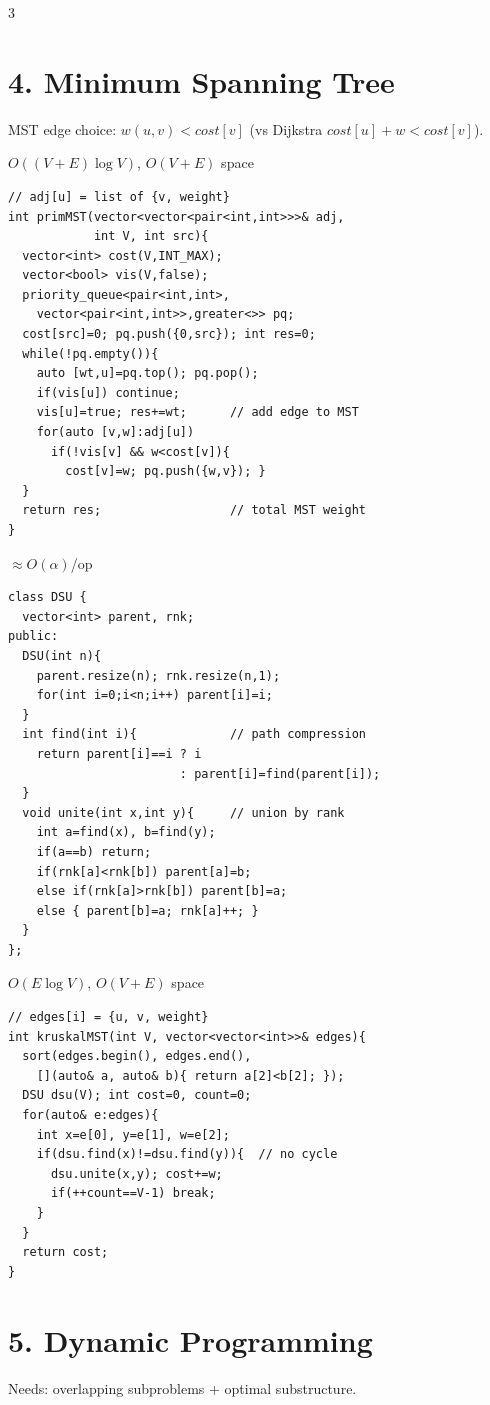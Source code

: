 \documentclass[8pt,landscape,a4paper]{extarticle}
\newcommand{\algo}[2]{\vspace{1pt}{\bfseries #1}\hfill{\footnotesize\color{cx}#2}\par\vspace{-1pt}}
\begin{document}
\begin{multicols}{3}
\section*{4. Minimum Spanning Tree}
{\footnotesize MST edge choice: $w(u,v)<cost[v]$ (vs Dijkstra $cost[u]{+}w<cost[v]$).}

\algo{Prim's Algorithm}{$O((V{+}E)\log V)$, $O(V{+}E)$ space}
\begin{lstlisting}
// adj[u] = list of {v, weight}
int primMST(vector<vector<pair<int,int>>>& adj,
            int V, int src){
  vector<int> cost(V,INT_MAX);
  vector<bool> vis(V,false);
  priority_queue<pair<int,int>,
    vector<pair<int,int>>,greater<>> pq;
  cost[src]=0; pq.push({0,src}); int res=0;
  while(!pq.empty()){
    auto [wt,u]=pq.top(); pq.pop();
    if(vis[u]) continue;
    vis[u]=true; res+=wt;      // add edge to MST
    for(auto [v,w]:adj[u])
      if(!vis[v] && w<cost[v]){
        cost[v]=w; pq.push({w,v}); }
  }
  return res;                  // total MST weight
}
\end{lstlisting}

\algo{DSU (Union by Rank + Path Compression)}{$\approx O(\alpha)$/op}
\begin{lstlisting}
class DSU {
  vector<int> parent, rnk;
public:
  DSU(int n){
    parent.resize(n); rnk.resize(n,1);
    for(int i=0;i<n;i++) parent[i]=i;
  }
  int find(int i){             // path compression
    return parent[i]==i ? i
                        : parent[i]=find(parent[i]);
  }
  void unite(int x,int y){     // union by rank
    int a=find(x), b=find(y);
    if(a==b) return;
    if(rnk[a]<rnk[b]) parent[a]=b;
    else if(rnk[a]>rnk[b]) parent[b]=a;
    else { parent[b]=a; rnk[a]++; }
  }
};
\end{lstlisting}

\algo{Kruskal's Algorithm}{$O(E\log V)$, $O(V{+}E)$ space}
\begin{lstlisting}
// edges[i] = {u, v, weight}
int kruskalMST(int V, vector<vector<int>>& edges){
  sort(edges.begin(), edges.end(),
    [](auto& a, auto& b){ return a[2]<b[2]; });
  DSU dsu(V); int cost=0, count=0;
  for(auto& e:edges){
    int x=e[0], y=e[1], w=e[2];
    if(dsu.find(x)!=dsu.find(y)){  // no cycle
      dsu.unite(x,y); cost+=w;
      if(++count==V-1) break;
    }
  }
  return cost;
}
\end{lstlisting}

\section*{5. Dynamic Programming}
{\footnotesize Needs: overlapping subproblems + optimal substructure.}


\end{multicols}
\end{document}
